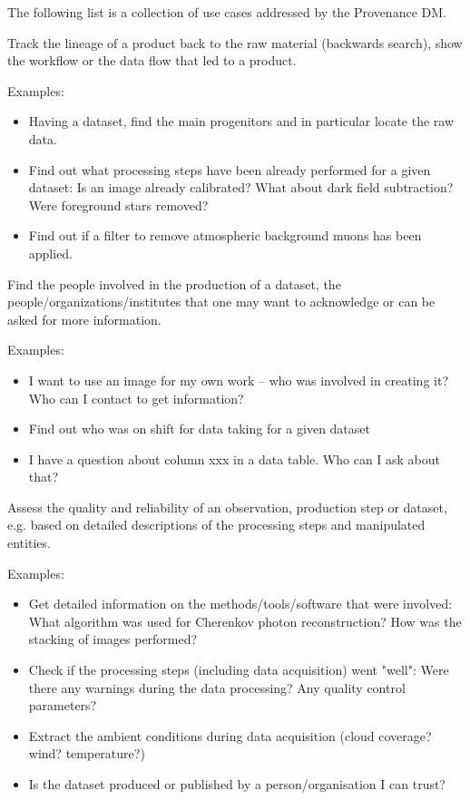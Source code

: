 The following list is a collection of use cases addressed by the Provenance DM. 


        Track the lineage of a product back to the raw material (backwards search), show the
        workflow or the data flow that led to a product.

        \noindent Examples: 
        \begin{itemize}
            \item Having a dataset, find the main progenitors and in particular locate the raw data.
            \item Find out what processing steps have been already performed for a given dataset: Is an image already calibrated? What about dark field subtraction? Were foreground stars removed?
            \item Find out if a filter to remove atmospheric background muons has been applied.
        \end{itemize}


        Find the people involved in the production of a dataset, the people\slash{}organizations\slash{}institutes that one may want to acknowledge or can be asked for more information.

        \noindent Examples: 
        \begin{itemize}
            \item I want to use an image for my own work -- who was involved in creating it? Who can I contact to get information? 
            \item Find out who was on shift for data taking for a given dataset
            \item I have a question about column xxx in a data table. Who can I ask about that? 
        \end{itemize}


Assess the quality and reliability of an observation, production step or dataset, e.g. based on detailed descriptions of the processing steps and manipulated entities.
        
        \noindent Examples:
        \begin{itemize}
            \item Get detailed information on the methods/tools/software that were involved: What algorithm was used for Cherenkov photon reconstruction? How was the stacking of images performed?
            \item Check if the processing steps (including data acquisition) went "well": Were there any warnings during the data processing? Any quality control parameters?
            \item Extract the ambient conditions during data acquisition (cloud coverage? wind? temperature?)
            \item Is the dataset produced or published by a person\slash{}organisation I can trust?
        \end{itemize}


